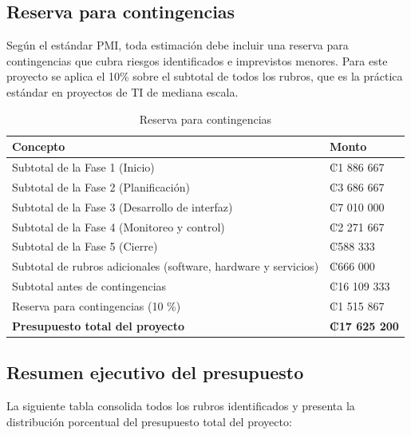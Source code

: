 \documentclass[11pt,spanish]{article}
\begin{document}
\subsection{Reserva para contingencias}

Según el estándar PMI, toda estimación debe incluir una reserva para contingencias que cubra riesgos identificados e imprevistos menores. Para este proyecto se aplica el 10\% sobre el subtotal de todos los rubros, que es la práctica estándar en proyectos de TI de mediana escala.

\begin{table}[H]
\centering
\caption{Reserva para contingencias}
\label{tab:reserva-contingencias}
\begin{tabularx}{\textwidth}{Y R{4cm}}
\toprule
\textbf{Concepto} & \textbf{Monto} \\
\midrule
Subtotal de la Fase 1 (Inicio) & ₡1 886 667 \\
Subtotal de la Fase 2 (Planificación) & ₡3 686 667 \\
Subtotal de la Fase 3 (Desarrollo de interfaz) & ₡7 010 000 \\
Subtotal de la Fase 4 (Monitoreo y control) & ₡2 271 667 \\
Subtotal de la Fase 5 (Cierre) & ₡588 333 \\
Subtotal de rubros adicionales (software, hardware y servicios) & ₡666 000 \\
\midrule
Subtotal antes de contingencias & ₡16 109 333 \\
Reserva para contingencias (10 \%) & ₡1 515 867 \\
\midrule
\textbf{Presupuesto total del proyecto} & \textbf{₡17 625 200} \\
\bottomrule
\end{tabularx}
\end{table}

\subsection{Resumen ejecutivo del presupuesto}

La siguiente tabla consolida todos los rubros identificados y presenta la distribución porcentual del presupuesto total del proyecto:
\end{document}
